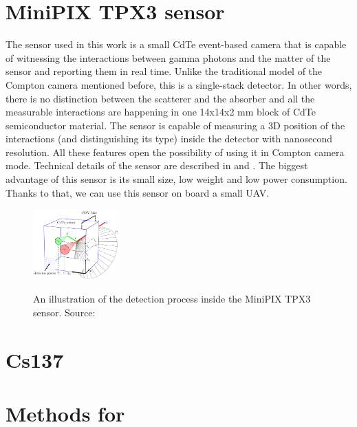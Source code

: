 \section{MiniPIX TPX3 sensor}
The sensor used in this work is a small CdTe event-based camera that is capable of witnessing the interactions between gamma photons and the matter of the sensor and reporting them in real time.
Unlike the traditional model of the Compton camera mentioned before, this is a single-stack detector.
In other words, there is no distinction between the scatterer and the absorber and all the measurable interactions are happening in one 14x14x2 mm block of CdTe semiconductor material.
The sensor is capable of measuring a 3D position of the interactions (and distinguishing its type) inside the detector with nanosecond resolution. 
All these features open the possibility of using it in Compton camera mode.
Technical details of the sensor are described in \cite{baca2021gamma} and \cite{baca2019timepix}.
The biggest advantage of this sensor is its small size, low weight and low power consumption.
Thanks to that, we can use this sensor on board a small UAV. 


\begin{figure}[!h]
    \centering
    \includegraphics[width=0.3\textwidth]{./fig/photos/minipix.png}
    \label{fig:minipix}
    \caption{An illustration of the detection process inside the MiniPIX TPX3 sensor. Source: \cite{baca2021gamma}}
\end{figure}

\section{Cs137}
\section{Methods for} 

